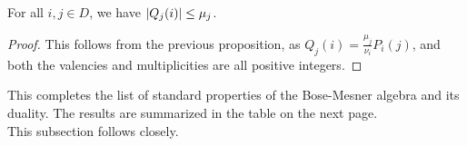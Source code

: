 \documentclass{report}
\begin{document}
      \begin{cor}
        For all $i, j \in D$, we have $\left\lvert Q_j(i) \right\rvert \leq \mu_j$.
      \end{cor}

      \begin{proof}
        This follows from the previous proposition, as $Q_j(i) =
        \frac{\mu_j}{\nu_i} P_i(j)$, and both the valencies and multiplicities
        are all positive integers.
      \end{proof}

      This completes the list of standard properties of the Bose-Mesner algebra
      and its duality.  The results are summarized in the table on the next
      page.
      \\

      This subsection follows \cite[Section~12.2]{godsil} closely.

      \newpage
\end{document}
